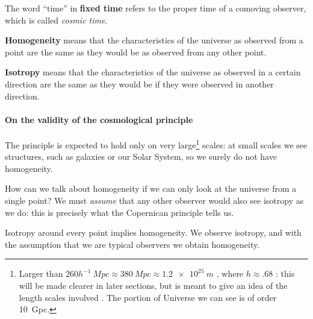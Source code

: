 \documentclass[main.tex]{subfiles}
\begin{document}


The word ``time'' in \textbf{fixed time} refers to the proper time of a comoving observer, which is called \emph{cosmic time}.


\textbf{Homogeneity} means that the characteristics of the universe as observed from a point are the same as they would be as observed from any other point. 

\textbf{Isotropy} means that the characteristics of the universe as observed in a certain direction are the same as they would be if they were observed in another direction.

\paragraph{On the validity of the cosmological principle}

The principle is expected to hold only on very large\footnote{Larger than \(260 h^{-1} \SI{}{Mpc} \approx \SI{380}{Mpc} \approx \SI{1.2e25}{m}\) \cite[]{Yadav+:2010}, where \(h \approx \num{.68}\) \cite[]{PlanckCollaboration:2016XIII}: this will be made clearer in later sections, but is meant to give an idea of the length scales involved . The portion of Universe we can see is of order \SI{10}{Gpc}.} scales:
at small scales we see structures, such as galaxies or our Solar System, so we surely do not have homogeneity.


How can we talk about homogeneity if we can only look at the universe from a single point?
We must \emph{assume} that any other observer would also see isotropy as we do: this is precisely what the Copernican principle tells us.

Isotropy around every point implies homogeneity. We observe isotropy, and with the assumption that we are typical observers we obtain homogeneity.
\end{document}
